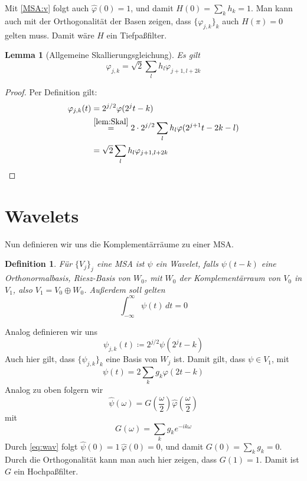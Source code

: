\documentclass[]{scrartcl}
\theoremstyle{plain}
\newtheorem{lem}[theo]{Lemma}
\newtheorem{defn}[theo]{Definition}
\theoremstyle{remark}
\begin{document}
    Mit \autoref{MSA:v} folgt auch $\hat{\varphi}(0) = 1$, und damit $H(0) = \sum_k h_k = 1$. Man kann auch mit der Orthogonalität der Basen zeigen, dass $\{\varphi_{j,k}\}_k$ auch $H(\pi) = 0$ gelten muss. Damit wäre $H$ ein Tiefpaßfilter.

    \begin{lem}[Allgemeine Skallierungsgleichung]
        Es gilt \label{lem:Skal}
        $$\varphi_{j,k} = \sqrt{2} \sum_l h_l \varphi_{j+1, l+2k}$$
    \end{lem}

    \begin{proof} Per Definition gilt:
        \begin{align*}
            \varphi_{j, k} (t) &= 2^{j/2} \varphi(2^j t - k) \\
            &\stackrel{\autoref{lem:Skal}}{=} 2 \cdot 2^{j/2} \sum_l h_l \varphi(2^{j+1} t -2k -l) \\
            &= \sqrt{2} \sum_l h_l \varphi_{j+1, l + 2k}
        \end{align*}
    \end{proof}

    \section{Wavelets}

    Nun definieren wir uns die Komplementärräume zu einer MSA.

    \begin{defn}
        Für $\{V_j\}_j$ eine MSA ist $\psi$ ein Wavelet, falls $\psi(t-k)$ eine Orthonormalbasis, Riesz-Basis von $W_0$, mit $W_0$ der Komplementärraum von $V_0$ in $V_1$, also $V_1 = V_0 \oplus W_0$. Außerdem soll gelten 
        \begin{equation}
            \int_{-\infty}^\infty \psi(t) \, dt = 0 \label{eq:wav}
        \end{equation}
    \end{defn}

    Analog definieren wir uns
    $$\psi_{j, k}(t) \coloneqq 2^{j/2} \psi(2^j t - k)$$
    Auch hier gilt, dass $\{\psi_{j,k}\}_k$ eine Basis von $W_j$ ist.
    Damit gilt, dass $\psi \in V_1$, mit
    $$\psi (t) = 2 \sum_k g_k \varphi (2t - k)$$
    Analog zu oben folgern wir 
    $$\hat{\psi} (\omega) = G(\frac{\omega}{2}) \hat{\varphi}(\frac{\omega}{2})$$
    mit
    $$G(\omega) = \sum_k g_k e^{-ik\omega}$$
    Durch \autoref{eq:wav} folgt $\hat{\psi}(0) = 1 \: \hat{\varphi}(0) = 0$, und damit $G(0) = \sum_k g_k = 0$. Durch die Orthogonalität kann man auch hier zeigen, dass $G(1) = 1$. Damit ist $G$ ein Hochpaßfilter.
\end{document}
